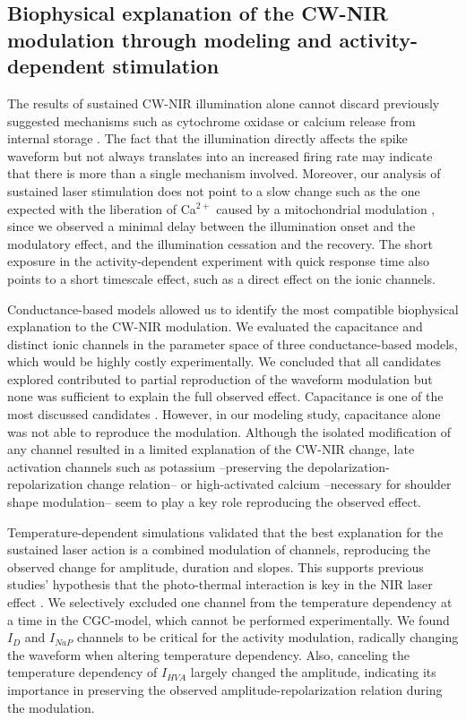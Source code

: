 \subsection{Biophysical explanation of the CW-NIR modulation through modeling and activity-dependent stimulation}
The results of sustained CW-NIR illumination alone cannot discard previously suggested mechanisms such as cytochrome oxidase \parencite{wang_impact_2017,saucedo_transcranial_2021} or calcium release from internal storage \parencite{lumbreras_pulsed_2014}. The fact that the illumination directly affects the spike waveform but not always translates into an increased firing rate may indicate that there is more than a single mechanism involved. Moreover, our analysis of sustained laser stimulation does not point to a slow change such as the one expected with the liberation of Ca$^{2+}$ caused by a mitochondrial modulation \parencite{dittami_intracellular_2011,lumbreras_pulsed_2014}, since we observed a minimal delay between the illumination onset and the modulatory effect, and the illumination cessation and the recovery. The short exposure in the activity-dependent experiment with quick response time also points to a short timescale effect, such as a direct effect on the ionic channels.

Conductance-based models allowed us to identify the most compatible biophysical explanation to the CW-NIR modulation. We evaluated the capacitance and distinct ionic channels in the parameter space of three conductance-based models, which would be highly costly experimentally. We concluded that all candidates explored contributed to partial reproduction of the waveform modulation but none was sufficient to explain the full observed effect. Capacitance is one of the most discussed candidates \parencite{shapiro_infrared_2012,cayce_infrared_2014,thompson_infrared_2015,plaksin_thermal_2018}. However, in our modeling study, capacitance alone was not able to reproduce the modulation. Although the isolated modification of any channel resulted in a limited explanation of the CW-NIR change, late activation channels such as potassium --preserving the depolarization-repolarization change relation-- or high-activated calcium --necessary for shoulder shape modulation-- seem to play a key role reproducing the observed effect.

Temperature-dependent simulations validated that the best explanation for the sustained laser action is a combined modulation of channels, reproducing the observed change for amplitude, duration and slopes. This supports previous studies' hypothesis that the photo-thermal interaction is key in the NIR laser effect \parencite{wells_application_2005,li_temporal_2013,albert_trpv4_2012,rabbitt_heat_2016, barrett_pulsed_2018,brown_thermal_2020,cury_infrared_2021}. We selectively excluded one channel from the temperature dependency at a time in the CGC-model, which cannot be performed experimentally. We found $I_D$ and $I_{NaP}$ channels to be critical for the activity modulation, radically changing the waveform when altering temperature dependency. Also, canceling the temperature dependency of $I_{HVA}$ largely changed the amplitude, indicating its importance in preserving the observed amplitude-repolarization relation during the modulation.

